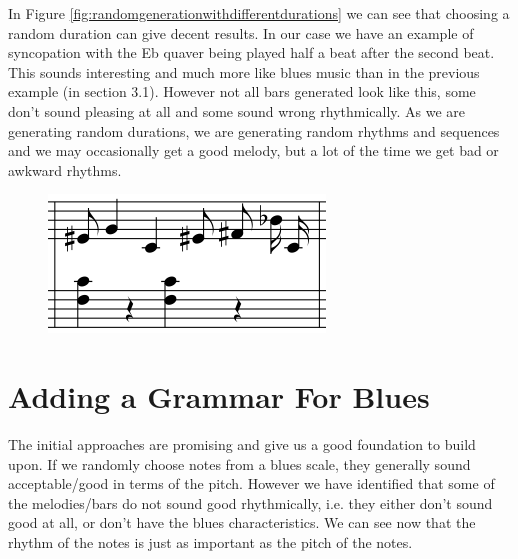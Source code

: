 \documentclass[pdftex,12pt,a4paper]{report}
\begin{document}
In Figure \ref{fig:randomgenerationwithdifferentdurations} we can see that choosing a random duration can give decent results. In our case we have an example of syncopation with the Eb quaver being played half a beat after the second beat. This sounds interesting and much more like blues music than in the previous example (in section 3.1). However not all bars generated look like this, some don't sound pleasing at all and some sound wrong rhythmically. As we are generating random durations, we are generating random rhythms and sequences and we may occasionally get a good melody, but a lot of the time we get bad or awkward rhythms. 

\begin{figure}[here]
  \centering
  \includegraphics[scale=0.6]{figure/randomgenerationdifferentdurations.png}
  \label{fig:probabilisticgenerationwithdifferentdurations}
\end{figure}


\section{Adding a Grammar For Blues}
The initial approaches are promising and give us a good foundation to build upon. If we randomly choose notes from a blues scale, they generally sound acceptable/good in terms of the pitch. However we have identified that some of the melodies/bars do not sound good rhythmically, i.e. they either don't sound good at all, or don't have the blues characteristics. We can see now that the rhythm of the notes is just as important as the pitch of the notes. 
\end{document}

